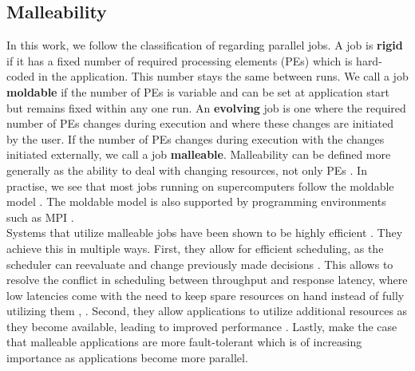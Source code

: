 \subsection{Malleability}
\label{prelim: malleability}
In this work, we follow the classification of \cite{feitelson1997job} regarding parallel jobs. A job is \textbf{rigid} if it has a fixed number of required processing elements (PEs) which is hard-coded in the application. This number stays the same between runs. We call a job \textbf{moldable} if the number of PEs is variable and can be set at application start but remains fixed within any one run. An \textbf{evolving} job is one where the required number of PEs changes during execution and where these changes are initiated by the user. If the number of PEs changes during execution with the changes initiated externally, we call a job \textbf{malleable}.
Malleability can be defined more generally as the ability to deal with changing resources, not only PEs \cite{sonmez2007scheduling}. In practise, we see that most jobs running on supercomputers follow the moldable model \cite{cirne2001model}. The moldable model is also supported by programming environments such as MPI \cite{hungershofer2004combined}. \\
Systems that utilize malleable jobs have been shown to be highly efficient \cite{feitelson1997job}.
They achieve this in multiple ways.
First, they allow for efficient scheduling, as the scheduler can reevaluate and change previously made decisions \cite{sonmez2007scheduling}. This allows to resolve the conflict in scheduling between throughput and response latency, where low latencies come with the need to keep spare resources on hand instead of fully utilizing them \cite{feitelson1997job}, \cite{hungershofer2004combined}.
Second, they allow applications to utilize additional resources as they become available, leading to improved performance \cite{hungershofer2004combined}. Lastly, \cite{buisson2005framework} make the case that malleable applications are more fault-tolerant which is of increasing importance as applications become more parallel. \\
